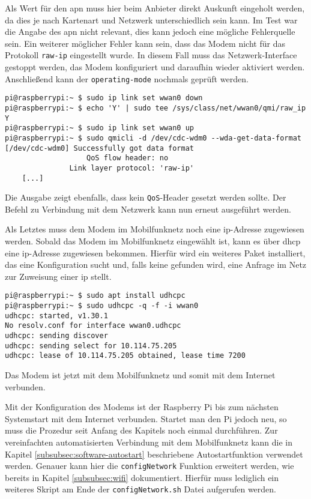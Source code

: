 \noindent Als Wert für den \gls{apn} muss hier beim Anbieter direkt Auskunft eingeholt werden, da dies je nach Kartenart und Netzwerk
unterschiedlich sein kann.
Im Test war die Angabe des \gls{apn} nicht relevant, dies kann jedoch eine mögliche Fehlerquelle sein.
Ein weiterer möglicher Fehler kann sein, dass das Modem nicht für das Protokoll \texttt{raw-ip} eingestellt wurde.
In diesem Fall muss das Netzwerk-Interface gestoppt werden, das Modem konfiguriert und daraufhin wieder aktiviert werden.
Anschließend kann der \texttt{operating-mode} nochmals geprüft werden.

\begin{lstlisting}
pi@raspberrypi:~ $ sudo ip link set wwan0 down
pi@raspberrypi:~ $ echo 'Y' | sudo tee /sys/class/net/wwan0/qmi/raw_ip
Y
pi@raspberrypi:~ $ sudo ip link set wwan0 up
pi@raspberrypi:~ $ sudo qmicli -d /dev/cdc-wdm0 --wda-get-data-format
[/dev/cdc-wdm0] Successfully got data format
                   QoS flow header: no
               Link layer protocol: 'raw-ip'
    [...]
\end{lstlisting}

\noindent Die Ausgabe zeigt ebenfalls, dass kein \texttt{QoS}-Header gesetzt werden sollte.
Der Befehl zu Verbindung mit dem Netzwerk kann nun erneut ausgeführt werden.

Als Letztes muss dem Modem im Mobilfunknetz noch eine \gls{ip}-Adresse zugewiesen werden.
Sobald das Modem im Mobilfunknetz eingewählt ist, kann es über \gls{dhcp} eine \gls{ip}-Adresse zugewiesen bekommen.
Hierfür wird ein weiteres Paket installiert, das eine Konfiguration sucht und, falls keine gefunden wird, eine
Anfrage im Netz zur Zuweisung einer \gls{ip} stellt.

\begin{lstlisting}
pi@raspberrypi:~ $ sudo apt install udhcpc
pi@raspberrypi:~ $ sudo udhcpc -q -f -i wwan0
udhcpc: started, v1.30.1
No resolv.conf for interface wwan0.udhcpc
udhcpc: sending discover
udhcpc: sending select for 10.114.75.205
udhcpc: lease of 10.114.75.205 obtained, lease time 7200
\end{lstlisting}

\noindent Das Modem ist jetzt mit dem Mobilfunknetz und somit mit dem Internet verbunden.


Mit der Konfiguration des Modems ist der Raspberry Pi bis zum nächsten Systemstart mit dem Internet verbunden.
Startet man den Pi jedoch neu, so muss die Prozedur seit Anfang des Kapitels noch einmal durchführen.
Zur vereinfachten automatisierten Verbindung mit dem Mobilfunknetz kann die in Kapitel \ref{subsubsec:software-autostart}
beschriebene Autostartfunktion verwendet werden.
Genauer kann hier die \texttt{configNetwork} Funktion erweitert werden, wie bereits in Kapitel \ref{subsubsec:wifi}
dokumentiert.
Hierfür muss lediglich ein weiteres Skript am Ende der \texttt{configNetwork.sh} Datei aufgerufen werden.

